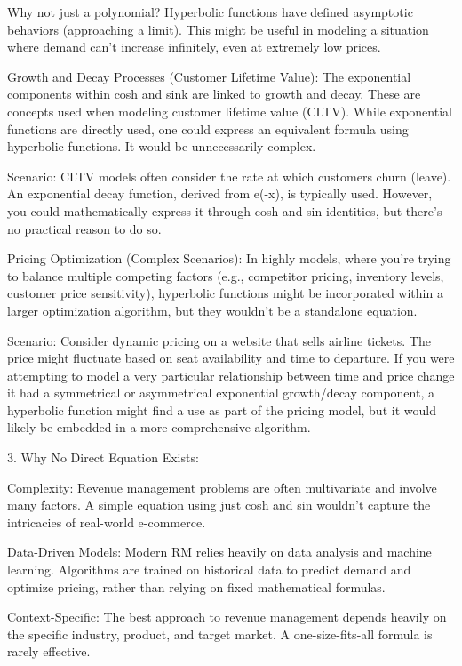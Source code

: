 \documentclass{book}
\begin{document}
Why not just a polynomial? Hyperbolic functions have defined asymptotic behaviors (approaching a limit). This might be useful in modeling a situation where demand can't increase infinitely, even at extremely low prices.

Growth and Decay Processes (Customer Lifetime Value): The exponential components within cosh and sink are linked to growth and decay. These are concepts used when modeling customer lifetime value (CLTV). While exponential functions are directly used, one could express an equivalent formula using hyperbolic functions. It would be unnecessarily complex.

Scenario: CLTV models often consider the rate at which customers churn (leave). An exponential decay function, derived from e(-x), is typically used. However, you could mathematically express it through cosh and sin identities, but there's no practical reason to do so.

Pricing Optimization (Complex Scenarios): In highly models, where you're trying to balance multiple competing factors (e.g., competitor pricing, inventory levels, customer price sensitivity), hyperbolic functions might be incorporated within a larger optimization algorithm, but they wouldn't be a standalone equation.

Scenario: Consider dynamic pricing on a website that sells airline tickets. The price might fluctuate based on seat availability and time to departure. If you were attempting to model a very particular relationship between time and price change it had a symmetrical or asymmetrical exponential growth/decay component, a hyperbolic function might find a use as part of the pricing model, but it would likely be embedded in a more comprehensive algorithm.

3. Why No Direct Equation Exists:

Complexity: Revenue management problems are often multivariate and involve many factors. A simple equation using just cosh and sin wouldn't capture the intricacies of real-world e-commerce.

Data-Driven Models: Modern RM relies heavily on data analysis and machine learning. Algorithms are trained on historical data to predict demand and optimize pricing, rather than relying on fixed mathematical formulas.

Context-Specific: The best approach to revenue management depends heavily on the specific industry, product, and target market. A one-size-fits-all formula is rarely effective.
\end{document}
